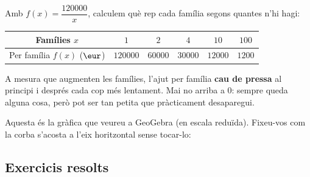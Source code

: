\begin{exemple}
Amb $f(x)=\dfrac{\num{120000}}{x}$, calculem què rep cada família segons quantes
n'hi hagi:
\begin{center}
\begin{tabular}{c c c c c c}
\toprule
Famílies $x$ & $1$ & $2$ & $4$ & $10$ & $100$ \\
\midrule
Per família $f(x)$ ($\eur$) & $\num{120000}$ & $\num{60000}$ & $\num{30000}$ & $\num{12000}$ & $\num{1200}$ \\
\bottomrule
\end{tabular}
\end{center}
A mesura que augmenten les famílies, l'ajut per família \textbf{cau de pressa} al
principi i després cada cop més lentament. Mai no arriba a $0$: sempre queda alguna
cosa, però pot ser tan petita que pràcticament desaparegui.
\end{exemple}

\begin{exemple}
Aquesta és la gràfica que veureu a GeoGebra (en escala reduïda). Fixeu-vos com la
corba s'acosta a l'eix horitzontal sense tocar-lo:

\begin{center}

\end{center}
\end{exemple}

\subsection{Exercicis resolts}

